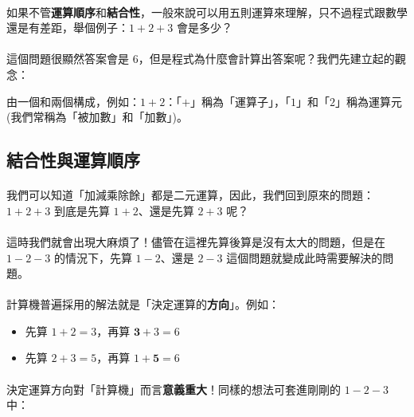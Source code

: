 \documentclass[12pt,a4paper,oneside]{report}
\begin{document}
\begin{CJK}{UTF8}{bkai}
\paragraph{}如果不管\textbf{運算順序}和\textbf{結合性}，一般來說可以用五則運算來理解，只不過程式跟數學還是有差距，舉個例子：$1+2+3$ 會是多少？

\paragraph{}這個問題很顯然答案會是 $6$，但是程式為什麼會計算出答案呢？我們先建立起的觀念：

\begin{mydef}
由一個和兩個構成，例如：$1+2$：「$+$」稱為「運算子」，「$1$」和「$2$」稱為運算元 (我們常稱為「被加數」和「加數」)。
\label{basic:cpp:def:binary:operator}
\end{mydef}

\subsection{結合性與運算順序}

\paragraph{}我們可以知道「加減乘除餘」都是二元運算，因此，我們回到原來的問題：$1+2+3$ 到底是先算 $1+2$、還是先算 $2+3$ 呢？

\paragraph{}這時我們就會出現大麻煩了！儘管在這裡先算後算是沒有太大的問題，但是在 $1-2-3$ 的情況下，先算 $1-2$、還是 $2-3$ 這個問題就變成此時需要解決的問題。

\paragraph{}計算機普遍採用的解法就是「決定運算的\textbf{方向}」。例如：
\begin{itemize}
\item 先算 $1+2=3$，再算 $\textbf{3}+3=6$
\item 先算 $2+3=5$，再算 $1+\textbf{5}=6$
\end{itemize}

\paragraph{}決定運算方向對「計算機」而言\textbf{意義重大}！同樣的想法可套進剛剛的 $1-2-3$ 中：


\end{CJK}
\end{document}
